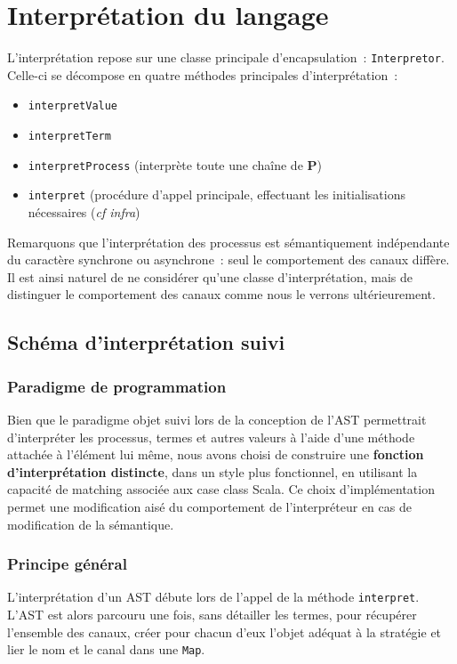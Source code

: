 \documentclass[11pt]{article} %
\begin{document}
\section{Interprétation du langage}

  L'interprétation repose sur une classe principale d'encapsulation~: \texttt{Interpretor}.  Celle-ci se décompose en quatre méthodes principales d'interprétation~:
\begin{itemize}
  \item \texttt{interpretValue}
  \item \texttt{interpretTerm}
  \item \texttt{interpretProcess} (interprète toute une chaîne de \textbf{P})
  \item \texttt{interpret} (procédure d'appel principale, effectuant les initialisations nécessaires (\emph{cf infra})
\end{itemize}

Remarquons que l'interprétation des processus est sémantiquement indépendante du caractère synchrone ou asynchrone~: seul le comportement des canaux diffère. Il est ainsi naturel de ne considérer qu'une classe d'interprétation, mais de distinguer le comportement des canaux comme nous le verrons ultérieurement.

\subsection{Schéma d'interprétation suivi}

\subsubsection{Paradigme de programmation}
Bien que le paradigme objet suivi lors de la conception de l'AST permettrait d'interpréter les processus, termes et autres valeurs à l'aide d'une méthode attachée à l'élément lui même, nous avons choisi de construire une \textbf{fonction d'interprétation distincte}, dans un style plus fonctionnel, en utilisant la capacité de matching associée aux case class Scala. Ce choix d'implémentation permet une modification aisé du comportement de l'interpréteur en cas de modification de la sémantique.

\subsubsection{Principe général}
L'interprétation d'un AST débute lors de l'appel de la méthode \texttt{interpret}. L'AST est alors parcouru une fois, sans détailler les termes, pour récupérer l'ensemble des canaux, créer pour chacun d'eux l'objet adéquat à la stratégie et lier le nom et le canal dans une \texttt{Map}.
\end{document}
